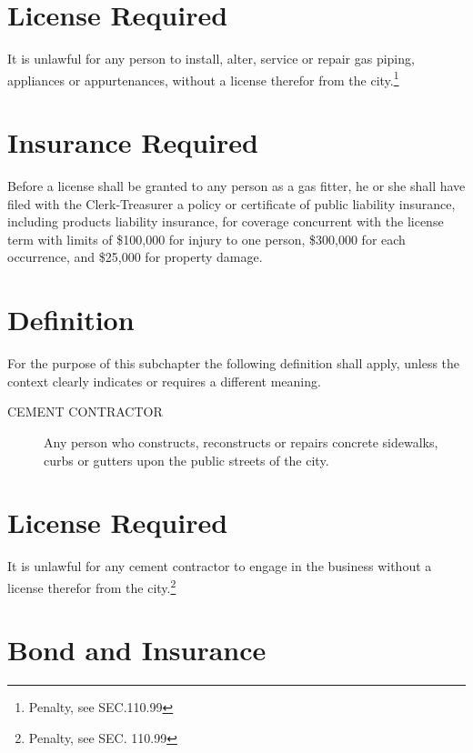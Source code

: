 
\setcounter{section}{14}
\section{License Required}
It is unlawful for any person to install, alter, service or repair gas piping, appliances or appurtenances, without a license therefor from the city.\footnote{Penalty, see SEC.110.99}

\section{Insurance Required}
Before a license shall be granted to any person as a gas fitter, he or she shall have filed with the Clerk-Treasurer a policy or certificate of public liability insurance, including products liability insurance, for coverage concurrent with the license term with limits of \$100,000 for injury to one person, \$300,000 for each occurrence, and \$25,000 for property damage.


\setcounter{section}{29}
\section{Definition}
For the purpose of this subchapter the following definition shall apply, unless the context clearly indicates or requires a different meaning.
\begin{description}
    \item[CEMENT CONTRACTOR] Any person who constructs, reconstructs or repairs concrete sidewalks, curbs or gutters upon the public streets of the city.
\end{description}

\section{License Required}
It is unlawful for any cement contractor to engage in the business without a license therefor from the city.\footnote{Penalty, see SEC. 110.99}

\section{Bond and Insurance}
